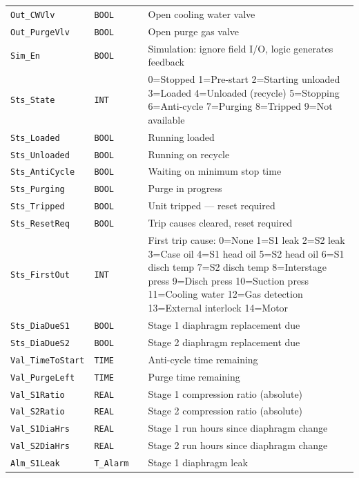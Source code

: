 \begin{small}
\begin{longtable}{@{}P{3.70cm}P{2.20cm}P{1.70cm}P{8.91cm}@{}}
\texttt{Out\_CWVlv} & \texttt{BOOL} &  & Open cooling water valve \\
\texttt{Out\_PurgeVlv} & \texttt{BOOL} &  & Open purge gas valve \\
\texttt{Sim\_En} & \texttt{BOOL} &  & Simulation: ignore field I/\allowbreak{}O, logic generates feedback \\
\texttt{Sts\_State} & \texttt{INT} &  & 0=Stopped 1=Pre-start 2=Starting unloaded 3=Loaded 4=Unloaded (recycle) 5=Stopping 6=Anti-cycle 7=Purging 8=Tripped 9=Not available \\
\texttt{Sts\_Loaded} & \texttt{BOOL} &  & Running loaded \\
\texttt{Sts\_Unloaded} & \texttt{BOOL} &  & Running on recycle \\
\texttt{Sts\_AntiCycle} & \texttt{BOOL} &  & Waiting on minimum stop time \\
\texttt{Sts\_Purging} & \texttt{BOOL} &  & Purge in progress \\
\texttt{Sts\_Tripped} & \texttt{BOOL} &  & Unit tripped --- reset required \\
\texttt{Sts\_ResetReq} & \texttt{BOOL} &  & Trip causes cleared, reset required \\
\texttt{Sts\_FirstOut} & \texttt{INT} &  & First trip cause: 0=None 1=S1 leak 2=S2 leak 3=Case oil 4=S1 head oil 5=S2 head oil 6=S1 disch temp 7=S2 disch temp 8=Interstage press 9=Disch press 10=Suction press 11=Cooling water 12=Gas detection 13=External interlock 14=Motor \\
\texttt{Sts\_DiaDueS1} & \texttt{BOOL} &  & Stage 1 diaphragm replacement due \\
\texttt{Sts\_DiaDueS2} & \texttt{BOOL} &  & Stage 2 diaphragm replacement due \\
\texttt{Val\_TimeToStart} & \texttt{TIME} &  & Anti-cycle time remaining \\
\texttt{Val\_PurgeLeft} & \texttt{TIME} &  & Purge time remaining \\
\texttt{Val\_S1Ratio} & \texttt{REAL} &  & Stage 1 compression ratio (absolute) \\
\texttt{Val\_S2Ratio} & \texttt{REAL} &  & Stage 2 compression ratio (absolute) \\
\texttt{Val\_S1DiaHrs} & \texttt{REAL} &  & Stage 1 run hours since diaphragm change \\
\texttt{Val\_S2DiaHrs} & \texttt{REAL} &  & Stage 2 run hours since diaphragm change \\
\texttt{Alm\_S1Leak} & \texttt{T\_Alarm} &  & Stage 1 diaphragm leak \\

\end{longtable}
\end{small}
